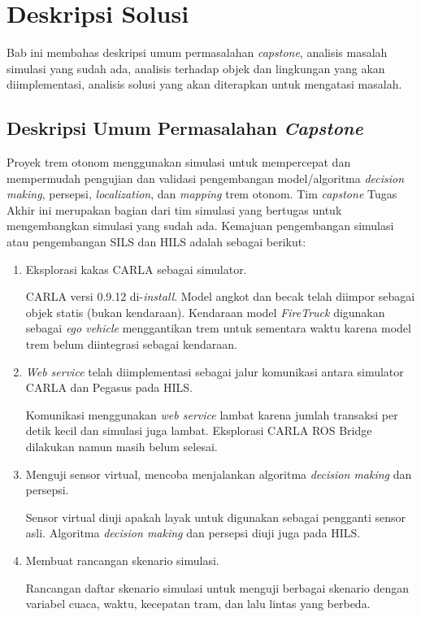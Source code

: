 \chapter{Deskripsi Solusi}

Bab ini membahas deskripsi umum permasalahan \textit{capstone}, analisis masalah
simulasi yang sudah ada, analisis terhadap objek dan lingkungan yang akan
diimplementasi, analisis solusi yang akan diterapkan untuk mengatasi masalah.

\section{Deskripsi Umum Permasalahan \textit{Capstone}}

Proyek trem otonom menggunakan simulasi untuk mempercepat dan mempermudah
pengujian dan validasi pengembangan model/algoritma \textit{decision making},
persepsi, \textit{localization}, dan \textit{mapping} trem otonom. Tim
\textit{capstone} Tugas Akhir ini merupakan bagian dari tim simulasi yang
bertugas untuk mengembangkan simulasi yang sudah ada. Kemajuan
pengembangan simulasi atau pengembangan SILS dan HILS adalah sebagai berikut:

\begin{enumerate}

	\item Eksplorasi kakas CARLA sebagai simulator.

	CARLA versi 0.9.12 di-\textit{install}. Model angkot dan becak telah diimpor
	sebagai objek statis (bukan kendaraan). Kendaraan model \textit{FireTruck}
	digunakan sebagai \textit{ego vehicle} menggantikan trem untuk sementara
	waktu karena model trem belum diintegrasi sebagai kendaraan.

	\item \textit{Web service} telah diimplementasi sebagai jalur komunikasi
	antara simulator CARLA dan Pegasus pada HILS.

	Komunikasi menggunakan \textit{web service} lambat karena jumlah transaksi
	per detik kecil dan simulasi juga lambat. Eksplorasi CARLA ROS Bridge
	dilakukan namun masih belum selesai.

	\item Menguji sensor virtual, mencoba menjalankan algoritma \textit{decision
	making} dan persepsi.

	Sensor virtual diuji apakah layak untuk digunakan sebagai pengganti sensor
	asli. Algoritma \textit{decision making} dan persepsi diuji juga pada HILS.

	\item Membuat rancangan skenario simulasi.

	Rancangan daftar skenario simulasi untuk menguji berbagai skenario dengan
	variabel cuaca, waktu, kecepatan tram, dan lalu lintas yang berbeda.

\end{enumerate}


